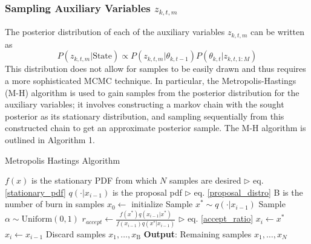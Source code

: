 \documentclass[twocolumn, final]{svjour3}
\newcommand{\willie}[1]{\textcolor{green}{\textsf{\emph{\textbf{\textcolor{green}{#1}}}}}}
\begin{document}

\subsubsection{Sampling Auxiliary Variables $z_{k,t,m}$}
The posterior distribution of each of the auxiliary variables $z_{k,t,m}$ can be written as
\begin{equation}
\label{stationary_pdf}
P(z_{k,t,m} | \text{State}) \propto  P(z_{k,t,m} | \theta_{k,t-1}) P(\theta_{k,t} | z_{k,t,1:M})
\end{equation}
This distribution does not allow for samples to be easily drawn and thus requires a more sophisticated MCMC technique. In particular, the Metropolis-Hastings (M-H) algorithm is used to gain samples from the posterior distribution for the auxiliary variables; it involves constructing a markov chain with the sought posterior as its stationary distribution, and sampling sequentially from this constructed chain to get an approximate posterior sample. The M-H algorithm is outlined in Algorithm 1.%

\begin{algorithm}[h!]
\label{alg:MH}
\caption{Metropolis Hastings Algorithm}
\begin{algorithmic}[1]
\STATE $f(x)$ is the stationary PDF from which $N$ samples are desired \hfill $\triangleright$ eq. \eqref{stationary_pdf}
\STATE $q( \cdot | x_{i-1})$ is the proposal pdf \hfill $\triangleright$ eq. \eqref{proposal_distro}
\STATE B is the number of burn in samples
\STATE $x_{0} \leftarrow$ initialize
\STATE Sample $x^{*} \sim q( \cdot | x_{i-1})$
\STATE Sample $\alpha \sim \text{Uniform}(0,1)$
\STATE $r_{accept} \leftarrow \frac{f(x^{*})q(x_{i-1} | x^{*})} {f(x_{i-1})q(x^{*} | x_{i-1})} $ \hfill $\triangleright$  eq. \eqref{accept_ratio}
\STATE $x_{i} \leftarrow x^{*}$
\ELSE
\STATE $x_{i} \leftarrow x_{i-1}$
\ENDIF
\ENDFOR
\STATE Discard samples $x_{1}, \ldots, x_{\text{B}}$
\STATE \textbf{Output}: Remaining samples $x_{1}, \ldots, x_{N}$
\end{algorithmic}
\end{algorithm}
\end{document}
